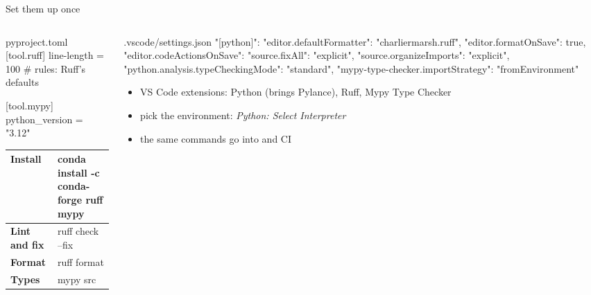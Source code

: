 \begin{frame}[fragile,source={Astral (2026), Ruff: editor setup · Microsoft (2026), Mypy Type Checker; Pylance README}]{Set them up once}
  \begin{columns}[T,onlytextwidth]
    \begin{column}{0.475\textwidth}
\begin{codefile}[style=sh,basicstyle=\ttfamily\fontsize{7}{8.4}\selectfont]{pyproject.toml}
[tool.ruff]
line-length = 100       # rules: Ruff's defaults

[tool.mypy]
python_version = "3.12"
\end{codefile}
      \scriptsize\renewcommand{}\setlength\tabcolsep{3pt}
      \begin{tabularx}{\linewidth}{@{}>{\bfseries}l>{\ttfamily}X@{}}
        \toprule
        Install        & conda install -c conda-forge ruff mypy\\
        \midrule
        Lint and fix   & ruff check --fix\\
        Format         & ruff format\\
        Types          & mypy src\\
        \bottomrule
      \end{tabularx}
    \end{column}
    \begin{column}{0.495\textwidth}
\begin{codefile}[basicstyle=\ttfamily\fontsize{7}{8.4}\selectfont]{.vscode/settings.json}
"[python]": {
  "editor.defaultFormatter": "charliermarsh.ruff",
  "editor.formatOnSave": true,
  "editor.codeActionsOnSave": {
    "source.fixAll": "explicit",
    "source.organizeImports": "explicit"}},
"python.analysis.typeCheckingMode": "standard",
"mypy-type-checker.importStrategy":
  "fromEnvironment"
\end{codefile}
      \footnotesize
      \begin{itemize}\setlength\itemsep{1mm}
        \item VS Code extensions: Python (brings Pylance), Ruff, Mypy Type Checker
        \item pick the environment: \emph{Python: Select Interpreter}
        \item the same commands go into  and CI
      \end{itemize}
    \end{column}

\end{columns}
\end{frame}
